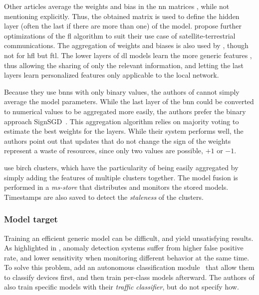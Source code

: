 Other articles average the weights and bias in the \gls{nn} matrices \cite{rathore_BlockSecIoTNetBlockchainbaseddecentralized_2019,schneble_Attackdetectionusing_2019,chen_Networkanomalydetection_2020}, while not mentioning  explicitly.
Thus, the obtained matrix is used to define the hidden layer (often the last if there are more than one) of the model.
\textcite{li_DeepFedFederatedDeep_2020b} propose further optimizations of the \gls{fl} algorithm to suit their use case of satellite-terrestrial communications.
The aggregation of weights and biases is also used by \cite{fan_IoTDefenderFederatedTransfer_2020}, though not for \gls{hfl} but \gls{ftl}.
The lower layers of \gls{dl} models learn the more generic features \cite{Yosinski2014}, thus allowing the sharing of only the relevant information, and letting the last layers learn personalized features only applicable to the local network.


Because they use \glspl{bnn} with only binary values, the authors of \cite{qin_LineSpeedScalableIntrusion_2020a} cannot simply average the model parameters.
While the last layer of the \gls{bnn} could be converted to numerical values to be aggregated more easily, the authors prefer the binary approach SignSGD~\cite{Bernstein2018}.
This aggregation algorithm relies on majority voting to estimate the best weights for the layers.
While their system performs well, the authors point out that updates that do not change the sign of the weights represent a waste of resources, since only two values are possible, \(+1\) or \(-1\).

\textcite{pahl_AllEyesYou_2018} use \gls{birch} clusters, which have the particularity of being easily aggregated by simply adding the features of multiple clusters together.
The model fusion is performed in a \emph{\gls{ms}-store} that distributes and monitors the stored models.
Timestamps are also saved to detect the \emph{staleness} of the clusters.


\subsubsection{Model target}
\label{sec:sota.quali.target}

Training an efficient generic model can be difficult, and yield unsatisfying results.
As highlighted in \cite{nguyen_DIoTFederatedSelflearning_2019}, anomaly detection systems suffer from higher false positive rate, and lower sensitivity when monitoring different behavior at the same time.
To solve this problem, \textcite{nguyen_DIoTFederatedSelflearning_2019} add an autonomous classification module~\cite{Marchal2019} that allow them to classify devices first, and then train per-class models afterward.
The authors of \cite{rathore_BlockSecIoTNetBlockchainbaseddecentralized_2019} also train specific models with their \emph{traffic classifier}, but do not specify how.

